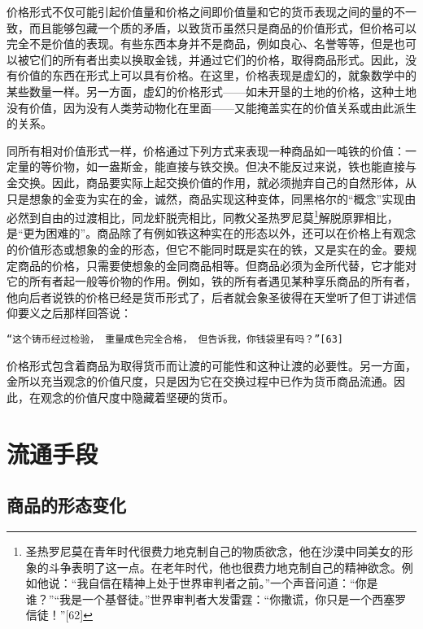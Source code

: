 \documentclass{ctexbook}
\begin{document}
    价格形式不仅可能引起价值量和价格之间即价值量和它的货币表现之间的量的不一致，而且能够包藏一个质的矛盾，以致货币虽然只是商品的价值形式，但价格可以完全不是价值的表现。有些东西本身并不是商品，例如良心、名誉等等，但是也可以被它们的所有者出卖以换取金钱，并通过它们的价格，取得商品形式。因此，没有价值的东西在形式上可以具有价格。在这里，价格表现是虚幻的，就象数学中的某些数量一样。另一方面，虚幻的价格形式——如未开垦的土地的价格，这种土地没有价值，因为没有人类劳动物化在里面——又能掩盖实在的价值关系或由此派生的关系。

    同所有相对价值形式一样，价格通过下列方式来表现一种商品如一吨铁的价值：一定量的等价物，如一盎斯金，能直接与铁交换。但决不能反过来说，铁也能直接与金交换。因此，商品要实际上起交换价值的作用，就必须抛弃自己的自然形体，从只是想象的金变为实在的金，诚然，商品实现这种变体，同黑格尔的“概念”实现由必然到自由的过渡相比，同龙虾脱壳相比，同教父圣热罗尼莫\footnote{圣热罗尼莫在青年时代很费力地克制自己的物质欲念，他在沙漠中同美女的形象的斗争表明了这一点。在老年时代，他也很费力地克制自己的精神欲念。例如他说：“我自信在精神上处于世界审判者之前。”一个声音问道：“你是谁？”“我是一个基督徒。”世界审判者大发雷霆：“你撒谎，你只是一个西塞罗信徒！”[62]}解脱原罪相比，是“更为困难的”。商品除了有例如铁这种实在的形态以外，还可以在价格上有观念的价值形态或想象的金的形态，但它不能同时既是实在的铁，又是实在的金。要规定商品的价格，只需要使想象的金同商品相等。但商品必须为金所代替，它才能对它的所有者起一般等价物的作用。例如，铁的所有者遇见某种享乐商品的所有者，他向后者说铁的价格已经是货币形式了，后者就会象圣彼得在天堂听了但丁讲述信仰要义之后那样回答说：

    \begin{center}
        \texttt{“这个铸币经过检验，\\重量成色完全合格，\\但告诉我，你钱袋里有吗？”[63]}
    \end{center}
    
    价格形式包含着商品为取得货币而让渡的可能性和这种让渡的必要性。另一方面，金所以充当观念的价值尺度，只是因为它在交换过程中已作为货币商品流通。因此，在观念的价值尺度中隐藏着坚硬的货币。

    \section{流通手段}

        \subsection{商品的形态变化}
\end{document}
